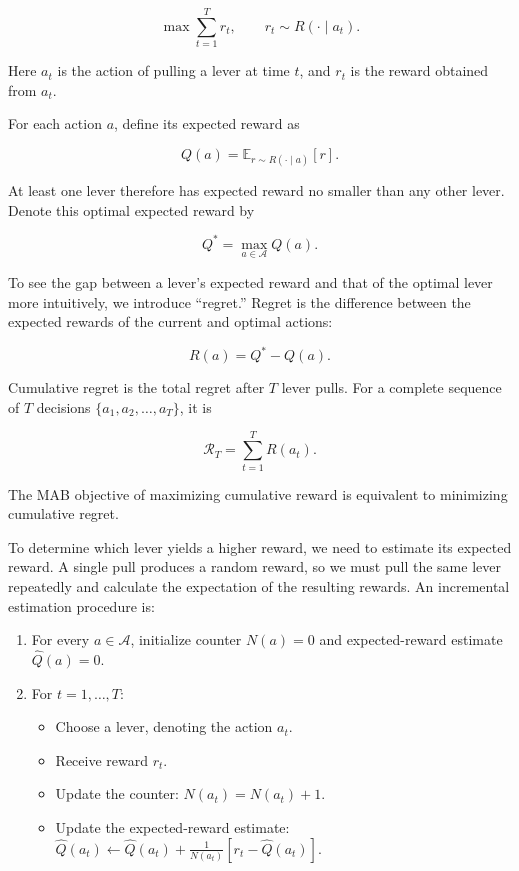 \[
\max \sum_{t=1}^{T} r_t,\qquad r_t \sim R(\cdot\mid a_t).
\]

Here \(a_t\) is the action of pulling a lever at time \(t\), and \(r_t\) is the reward obtained from \(a_t\).

For each action \(a\), define its expected reward as

\[
Q(a)=\mathbb{E}_{r\sim R(\cdot\mid a)}[r].
\]

At least one lever therefore has expected reward no smaller than any other lever. Denote this optimal expected reward by

\[
Q^{*}=\max_{a\in\mathcal{A}} Q(a).
\]

To see the gap between a lever's expected reward and that of the optimal lever more intuitively, we introduce ``regret.'' Regret is the difference between the expected rewards of the current and optimal actions:

\[
R(a)=Q^{*}-Q(a).
\]

Cumulative regret is the total regret after \(T\) lever pulls. For a complete sequence of \(T\) decisions \(\{a_1,a_2,\ldots,a_T\}\), it is

\[
\mathcal{R}_T=\sum_{t=1}^{T} R(a_t).
\]

The MAB objective of maximizing cumulative reward is equivalent to minimizing cumulative regret.

To determine which lever yields a higher reward, we need to estimate its expected reward. A single pull produces a random reward, so we must pull the same lever repeatedly and calculate the expectation of the resulting rewards. An incremental estimation procedure is:

\begin{enumerate}
\def\labelenumi{\arabic{enumi}.}
\tightlist
\item
  For every \(a\in\mathcal{A}\), initialize counter \(N(a)=0\) and expected-reward estimate \(\hat{Q}(a)=0\).
\item
{}
  For \(t=1,\ldots,T\):

  \begin{itemize}
  \tightlist
  \item
    Choose a lever, denoting the action \(a_t\).
  \item
    Receive reward \(r_t\).
  \item
    Update the counter: \(N(a_t)=N(a_t)+1\).
  \item
    Update the expected-reward estimate: \(\hat{Q}(a_t)\leftarrow \hat{Q}(a_t)+\frac{1}{N(a_t)}[r_t-\hat{Q}(a_t)]\).
  \end{itemize}
\end{enumerate}

